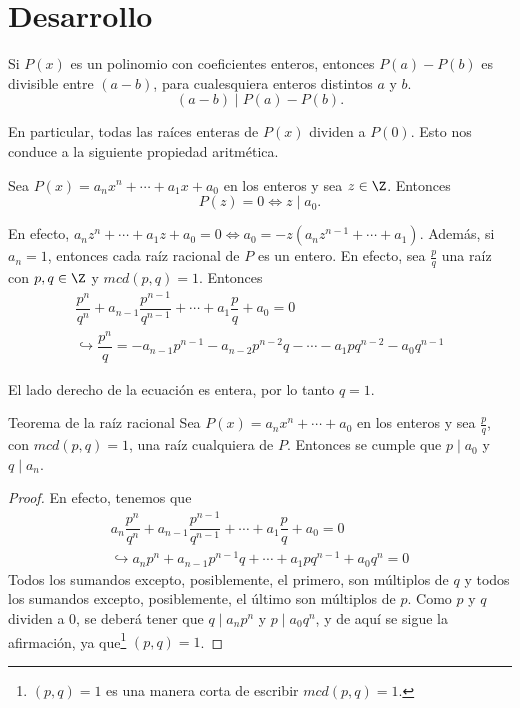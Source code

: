\section{Desarrollo}

\begin{theorem.tcb}{}{}
    Si $P(x)$ es un polinomio con coeficientes enteros, entonces $P(a) - P(b)$ es divisible entre $(a - b)$, para cualesquiera enteros distintos $a$ y $b$.
    \[
        (a - b) \mid P(a) - P(b).
    \]
\end{theorem.tcb}

En particular, todas las raíces enteras de $P(x)$ dividen a $P(0)$.
Esto nos conduce a la siguiente propiedad aritmética.

\begin{definition}
    Sea $P(x) = a_n x^n + \cdots + a_1 x + a_0$ en los enteros y sea $z \in \Z$.
    Entonces \[P(z) = 0 \Leftrightarrow z \mid a_0.\]
\end{definition}

En efecto, $a_n z^n + \cdots + a_1 z + a_0 = 0 \Leftrightarrow a_0 = -z(a_n z^{n - 1} + \cdots + a_1)$.
Además, si $a_n = 1$, entonces cada raíz racional de $P$ es un entero.
En efecto, sea $\frac{p}{q}$ una raíz con $p, q \in \Z$ y $mcd(p, q) = 1$.
Entonces
\begin{gather*}
    \dfrac{p^n}{q^n} + a_{n - 1} \dfrac{p^{n - 1}}{q^{n - 1}} + \cdots + a_1 \dfrac{p}{q} + a_0  = 0 \\
    \hookrightarrow \dfrac{p^n}{q} = - a_{n - 1} p^{n - 1} - a_{n - 2} p^{n - 2} q - \cdots - a_1 p q^{n - 2} - a_0 q^{n - 1}
\end{gather*}

El lado derecho de la ecuación es entera, por lo tanto $q = 1$.

\begin{theorem.tcb}{Teorema de la raíz racional}{}
    Sea $P(x) = a_n x^n + \cdots + a_0$ en los enteros y sea $\frac{p}{q}$, con $mcd(p, q) = 1$, una raíz cualquiera de $P$.
    Entonces se cumple que $p \mid a_0$ y $q \mid a_n$.
\end{theorem.tcb}
\begin{proof}
    En efecto, tenemos que
    \begin{gather*}
        a_n \dfrac{p^n}{q^n} + a_{n - 1} \dfrac{p^{n - 1}}{q^{n - 1}} + \cdots + a_1 \dfrac{p}{q} + a_0  = 0 \\
        \hookrightarrow a_n p^n + a_{n - 1}p^{n - 1}q + \cdots + a_1 p q^{n - 1} + a_0 q^n = 0
    \end{gather*}
    Todos los sumandos excepto, posiblemente, el primero, son múltiplos de $q$ y todos los sumandos excepto, posiblemente, el último son múltiplos de $p$.
    Como $p$ y $q$ dividen a 0, se deberá tener que $q \mid a_n p^n$ y $p \mid a_0 q^n$, y de aquí se sigue la afirmación, ya que\footnote{$(p, q) =  1$ es una manera corta de escribir $mcd(p, q) = 1$.} $(p, q) = 1$.
\end{proof}


